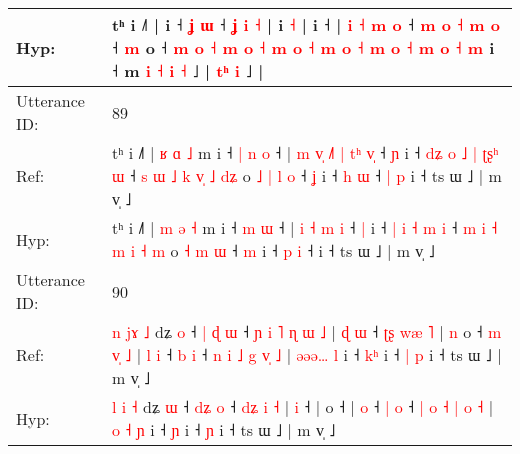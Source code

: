 \documentclass[10pt]{article}
\DeclareRobustCommand{\hl}[1]{{\textcolor{red}{#1}}}
\begin{document}
\begin{longtable}{ll}
 \\
Hyp: & tʰ i ˩˥ |\hl{}\hl{}\hl{}\hl{}\hl{}\hl{} i ˧\hl{}\hl{}\hl{}\hl{}\hl{}\hl{}\hl{}\hl{} \hl{ʝ} \hl{}\hl{ɯ} ˧ \hl{ʝ} \hl{i} \hl{˧} |\hl{}\hl{}\hl{} i \hl{}\hl{˧} |\hl{}\hl{}\hl{}\hl{}\hl{}\hl{}\hl{}\hl{} i ˧ |\hl{}\hl{} \hl{i} \hl{˧} \hl{m} \hl{}\hl{o} ˧\hl{}\hl{}\hl{}\hl{}\hl{}\hl{} \hl{m} \hl{}\hl{o} \hl{˧} \hl{m} \hl{o} ˧ \hl{}\hl{m} o ˧ \hl{m} \hl{o} \hl{˧} \hl{m} \hl{}\hl{o} \hl{˧} \hl{m} \hl{o} \hl{˧} \hl{m} \hl{o} \hl{}\hl{˧} \hl{}\hl{m} \hl{o} \hl{˧} \hl{m} \hl{o} \hl{˧} \hl{m} i ˧\hl{}\hl{} m\hl{}\hl{}\hl{}\hl{}\hl{}\hl{}\hl{} \hl{i} \hl{˧} \hl{i} \hl{˧} ˩\hl{} | \hl{t}\hl{ʰ} \hl{i} ˩ |
 \\
\midrule
Utterance ID: & 89 \\
Ref: & tʰ i ˩˥ | \hl{ʁ} \hl{ɑ} \hl{˩} m i ˧\hl{ }\hl{|} \hl{n} \hl{o} ˧ |\hl{ }\hl{m}\hl{ }\hl{v}\hl{̩} \hl{˩}\hl{˥} \hl{|} \hl{t}\hl{ʰ} \hl{v}\hl{̩} ˧ \hl{ɲ} i ˧\hl{ }\hl{d}\hl{ʑ} \hl{o} \hl{˩} \hl{|} \hl{ʈ}\hl{ʂ}\hl{ʰ} \hl{ɯ} ˧ \hl{s} \hl{ɯ} \hl{˩} \hl{k} \hl{v}\hl{̩} \hl{˩} \hl{d}\hl{ʑ} o\hl{ }\hl{˩} \hl{|} \hl{l} \hl{o} ˧ \hl{ʝ} i ˧ \hl{h} \hl{ɯ} ˧\hl{ }\hl{|}\hl{ }\hl{p} i ˧ ts ɯ ˩ | m v̩ ˩
 \\
Hyp: & tʰ i ˩˥ | \hl{m} \hl{ə} \hl{˧} m i ˧\hl{}\hl{} \hl{m} \hl{ɯ} ˧ |\hl{}\hl{}\hl{}\hl{}\hl{} \hl{}\hl{i} \hl{˧} \hl{}\hl{m} \hl{}\hl{i} ˧ \hl{|} i ˧\hl{}\hl{}\hl{} \hl{|} \hl{i} \hl{˧} \hl{}\hl{}\hl{m} \hl{i} ˧ \hl{m} \hl{i} \hl{˧} \hl{m} \hl{}\hl{i} \hl{˧} \hl{}\hl{m} o\hl{}\hl{} \hl{˧} \hl{m} \hl{ɯ} ˧ \hl{m} i ˧ \hl{p} \hl{i} ˧\hl{}\hl{}\hl{}\hl{} i ˧ ts ɯ ˩ | m v̩ ˩
 \\
\midrule
Utterance ID: & 90 \\
Ref: & \hl{n} \hl{j}\hl{ɤ} \hl{˩} dʑ \hl{o} ˧ \hl{|}\hl{ }\hl{ɖ} \hl{ɯ} ˧\hl{ }\hl{ɲ}\hl{ }\hl{i} \hl{˥}\hl{ }\hl{ɳ} \hl{ɯ} \hl{˩} |\hl{ }\hl{ɖ} \hl{ɯ} ˧\hl{ }\hl{ʈ}\hl{ʂ}\hl{ }\hl{w}\hl{æ}\hl{ }\hl{˥} |\hl{ }\hl{n} o ˧\hl{ }\hl{m}\hl{ }\hl{v}\hl{̩}\hl{ }\hl{˩} |\hl{ }\hl{l} \hl{i} ˧ \hl{b} \hl{i} ˧ \hl{n} \hl{i} \hl{˩} \hl{g} \hl{v}\hl{̩} \hl{˩} | \hl{ə}\hl{ə}\hl{ə}\hl{…} \hl{l} i ˧ \hl{k}\hl{ʰ} i ˧\hl{ }\hl{|} \hl{p} i ˧ ts ɯ ˩ | m v̩ ˩
 \\
Hyp: & \hl{l} \hl{}\hl{i} \hl{˧} dʑ \hl{ɯ} ˧ \hl{}\hl{d}\hl{ʑ} \hl{o} ˧\hl{}\hl{}\hl{}\hl{} \hl{}\hl{d}\hl{ʑ} \hl{i} \hl{˧} |\hl{}\hl{} \hl{i} ˧\hl{}\hl{}\hl{}\hl{}\hl{}\hl{}\hl{}\hl{} |\hl{}\hl{} o ˧\hl{}\hl{}\hl{}\hl{}\hl{}\hl{}\hl{} |\hl{}\hl{} \hl{o} ˧ \hl{|} \hl{o} ˧ \hl{|} \hl{o} \hl{˧} \hl{|} \hl{}\hl{o} \hl{˧} | \hl{}\hl{o}\hl{ }\hl{˧} \hl{ɲ} i ˧ \hl{}\hl{ɲ} i ˧\hl{}\hl{} \hl{ɲ} i ˧ ts ɯ ˩ | m v̩ ˩
 \\

\end{longtable}
\end{document}
